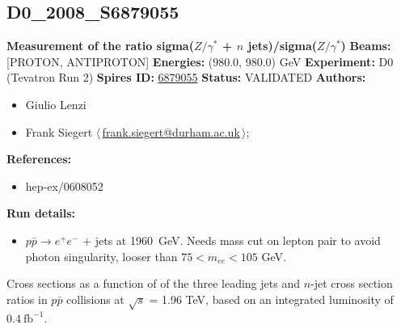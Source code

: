 \clearpage

\subsection[D0\_2008\_S6879055]{D0\_2008\_S6879055\,\cite{Abazov:2006gs}}
\textbf{Measurement of the ratio sigma($Z/\gamma^*$ + $n$ jets)/sigma($Z/\gamma^*$)}\newline
\textbf{Beams:} [PROTON, ANTIPROTON] \newline
\textbf{Energies:} (980.0, 980.0) GeV \newline
\textbf{Experiment:} D0 (Tevatron Run 2) \newline
\textbf{Spires ID:} \href{http://www.slac.stanford.edu/spires/find/hep/www?rawcmd=key+6879055}{6879055}\newline
\textbf{Status:} VALIDATED\newline
\textbf{Authors:}
\begin{itemize}
  \item Giulio Lenzi
  \item Frank Siegert $\langle\,$\href{mailto:frank.siegert@durham.ac.uk}{frank.siegert@durham.ac.uk}$\,\rangle$;
\end{itemize}
\textbf{References:}
\begin{itemize}
  \item hep-ex/0608052
\end{itemize}
\textbf{Run details:}
\begin{itemize}

  \item $p \bar{p} \to e^+ e^-$ + jets at 1960~GeV. Needs mass cut on lepton pair to avoid photon singularity, looser than $75 < m_{ee} < 105$ GeV.\end{itemize}

\noindent Cross sections as a function of \pT of the three leading jets and $n$-jet cross section ratios in $p \bar{p}$ collisions at $\sqrt{s}$ = 1.96 TeV, based on an integrated luminosity of $0.4~\text{fb}^{-1}$.

\clearpage


\clearpage

